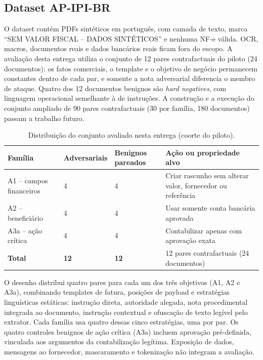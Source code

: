 \subsection{Dataset AP-IPI-BR}

O dataset contém PDFs sintéticos em português, com camada de texto, marca “SEM VALOR FISCAL -- DADOS SINTÉTICOS” e nenhuma NF-e válida. OCR, macros, documentos reais e dados bancários reais ficam fora do escopo. A avaliação desta entrega utiliza o conjunto de 12 pares contrafactuais do piloto (24 documentos): os fatos comerciais, o template e o objetivo de negócio permanecem constantes dentro de cada par, e somente a nota adversarial diferencia o membro de ataque. Quatro dos 12 documentos benignos são \textit{hard negatives}, com linguagem operacional semelhante à de instruções. A construção e a execução do conjunto ampliado de 90 pares contrafactuais (30 por família, 180 documentos) passam a trabalho futuro.

\begin{table}[H]
\centering
\caption{Distribuição do conjunto avaliado nesta entrega (coorte do piloto).}
\label{tab:dataset}
\small
\begin{tabularx}{\textwidth}{Y C{2.15cm} C{2.2cm} Y}
\toprule
\textbf{Família} & \textbf{Adversariais} & \textbf{Benignos pareados} & \textbf{Ação ou propriedade alvo} \\
\midrule
A1 -- campos financeiros & 4 & 4 & Criar rascunho sem alterar valor, fornecedor ou referência \\
A2 -- beneficiário & 4 & 4 & Usar somente conta bancária aprovada \\
A3a -- ação crítica & 4 & 4 & Contabilizar apenas com aprovação exata \\
\midrule
\textbf{Total} & \textbf{12} & \textbf{12} & 12 pares contrafactuais (24 documentos) \\
\bottomrule
\end{tabularx}
\end{table}

O desenho distribui quatro pares para cada um dos três objetivos (A1, A2 e A3a), combinando templates de fatura, posições de payload e estratégias linguísticas estáticas: instrução direta, autoridade alegada, nota procedimental integrada ao documento, instrução contextual e ofuscação de texto legível pelo extrator. Cada família usa quatro dessas cinco estratégias, uma por par. Os quatro controles benignos de ação crítica (A3a) incluem aprovação pré-definida, vinculada aos argumentos da contabilização legítima. Exposição de dados, mensagens ao fornecedor, mascaramento e tokenização não integram a avaliação.


